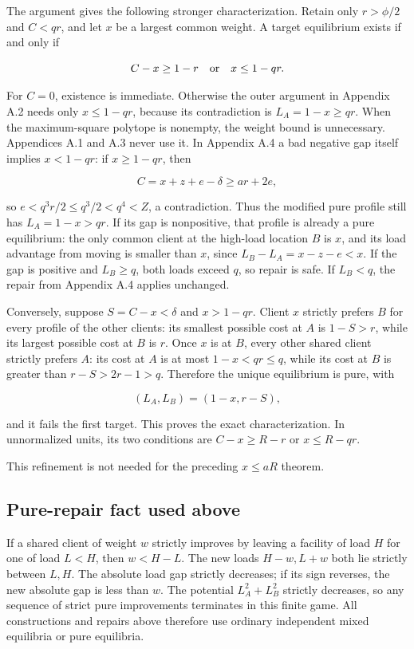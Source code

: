 \documentclass[11pt,a4paper]{article}
\begin{document}
The argument gives the following stronger characterization. Retain only \(r>\phi/2\) and \(C<qr\), and let \(x\) be a largest common weight. A target equilibrium exists if and only if

\[
C-x\ge1-r\quad\hbox{or}\quad x\le1-qr.
\]

For \(C=0\), existence is immediate. Otherwise the outer argument in Appendix A.2 needs only \(x\le1-qr\), because its contradiction is \(L_A=1-x\ge qr\). When the maximum-square polytope is nonempty, the weight bound is unnecessary. Appendices A.1 and A.3 never use it. In Appendix A.4 a bad negative gap itself implies \(x<1-qr\): if \(x\ge1-qr\), then

\[
C=x+z+e-\delta\ge ar+2e,
\]

so \(e<q^3r/2\le q^3/2<q^4<Z\), a contradiction. Thus the modified pure profile still has \(L_A=1-x>qr\). If its gap is nonpositive, that profile is already a pure equilibrium: the only common client at the high-load location \(B\) is \(x\), and its load advantage from moving is smaller than \(x\), since \(L_B-L_A=x-z-e<x\). If the gap is positive and \(L_B\ge q\), both loads exceed \(q\), so repair is safe. If \(L_B<q\), the repair from Appendix A.4 applies unchanged.

Conversely, suppose \(S=C-x<\delta\) and \(x>1-qr\). Client \(x\) strictly prefers \(B\) for every profile of the other clients: its smallest possible cost at \(A\) is \(1-S>r\), while its largest possible cost at \(B\) is \(r\). Once \(x\) is at \(B\), every other shared client strictly prefers \(A\): its cost at \(A\) is at most \(1-x<qr\le q\), while its cost at \(B\) is greater than \(r-S>2r-1>q\). Therefore the unique equilibrium is pure, with

\[
(L_A,L_B)=(1-x,r-S),
\]

and it fails the first target. This proves the exact characterization. In unnormalized units, its two conditions are \(C-x\ge R-r\) or \(x\le R-qr\).

This refinement is not needed for the preceding \(x\le aR\) theorem.

\subsection*{Pure-repair fact used above}

If a shared client of weight \(w\) strictly improves by leaving a facility of load \(H\) for one of load \(L<H\), then \(w<H-L\). The new loads \(H-w,L+w\) both lie strictly between \(L,H\). The absolute load gap strictly decreases; if its sign reverses, the new absolute gap is less than \(w\). The potential \(L_A^2+L_B^2\) strictly decreases, so any sequence of strict pure improvements terminates in this finite game. All constructions and repairs above therefore use ordinary independent mixed equilibria or pure equilibria.
\end{document}
